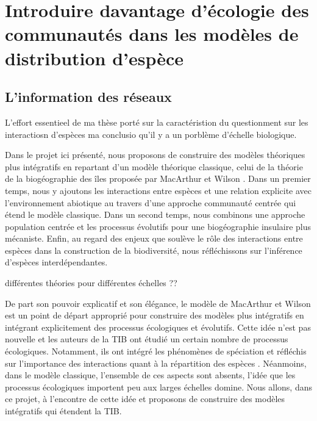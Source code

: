 \section*{Introduire davantage d'écologie des communautés dans les
modèles de distribution
d'espèce}\label{introduire-davantage-duxe9cologie-des-communautuxe9s-dans-les-moduxe8les-de-distribution-despuxe8ce}

\subsection*{L'information des
réseaux}\label{linformation-des-ruxe9seaux}

L'effort essentieel de ma thèse porté sur la caractéristion du
questionment sur les interactiosn d'espèces ma conclusio qu'il y a un
porblème d'échelle biologique.

Dans le projet ici présenté, nous proposons de construire des modèles
théoriques plus intégratifs en repartant d'un modèle théorique
classique, celui de la théorie de la biogéographie des îles proposée par
MacArthur et Wilson \cite{MacArthur1967}. Dans un premier temps, nous y
ajoutons les interactions entre espèces et une relation explicite avec
l'environnement abiotique au travers d'une approche communauté centrée
qui étend le modèle classique. Dans un second temps, nous combinons une
approche population centrée et les processus évolutifs pour une
biogéographie insulaire plus mécaniste. Enfin, au regard des enjeux que
soulève le rôle des interactions entre espèces dans la construction de
la biodiversité, nous réfléchissons sur l'inférence d'espèces
interdépendantes.

différentes théories pour différentes échelles ??

De part son pouvoir explicatif et son élégance, le modèle de MacArthur
et Wilson est un point de départ approprié pour construire des modèles
plus intégratifs en intégrant explicitement des processus écologiques et
évolutifs. Cette idée n'est pas nouvelle et les auteurs de la TIB ont
étudié un certain nombre de processus écologiques. Notamment, ils ont
intégré les phénomènes de spéciation \cite{MacArthur1967} et réfléchis
sur l'importance des interactions quant à la répartition des espèces
\cite{MacArthur1984}. Néanmoins, dans le modèle classique, l'ensemble de
ces aspects sont absents, l'idée que les processus écologiques importent
peu aux larges échelles domine. Nous allons, dans ce projet, à
l'encontre de cette idée et proposons de construire des modèles
intégratifs qui étendent la TIB.

